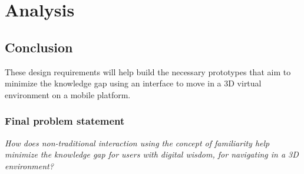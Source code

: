 \chapter{Analysis}







\section{Conclusion}
These design requirements will help build the necessary prototypes that aim to minimize the knowledge gap using an interface to move in a 3D virtual environment on a mobile platform.
\subsection{Final problem statement}
\textit{How does non-traditional interaction using the concept of familiarity help minimize the knowledge gap for users with digital wisdom, for navigating in a 3D environment?}